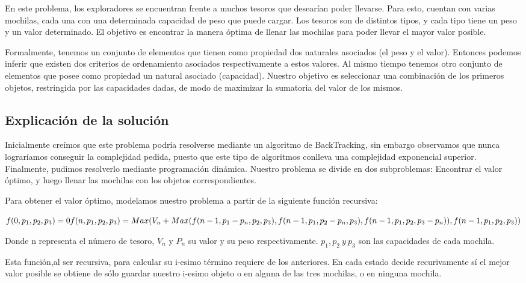 \documentclass[spanish,12pt]{article}
\begin{document}
{En este problema, los exploradores se encuentran frente a muchos tesoros que desearían poder llevarse. Para esto, cuentan con varias mochilas, cada una con una determinada capacidad de peso que puede cargar.
Los tesoros son de distintos tipos, y cada tipo tiene un peso y un valor determinado.
El objetivo es encontrar la manera óptima de llenar las mochilas para poder llevar el mayor valor posible.

Formalmente, tenemos un conjunto de elementos que tienen como propiedad dos naturales asociados (el peso y el valor). Entonces podemos inferir que existen dos criterios de ordenamiento asociados respectivamente a estos valores.
Al mismo tiempo tenemos otro conjunto de elementos que posee como propiedad un natural asociado (capacidad).
Nuestro objetivo es seleccionar una combinación de los primeros objetos, restringida por las capacidades dadas, de modo de maximizar la sumatoria del valor de los mismos. 


\subsection{Explicación de la solución}

   Inicialmente creímos que este problema podría resolverse mediante un algoritmo de BackTracking, sin embargo observamos que nunca lograríamos conseguir la complejidad pedida, puesto que este tipo de algoritmos conlleva una complejidad exponencial superior.
   Finalmente, pudimos resolverlo mediante programación dinámica. Nuestro problema se divide en dos subproblemas:
   Encontrar el valor óptimo, y luego llenar las mochilas con los objetos correspondientes.

   Para obtener el valor óptimo, modelamos nuestro problema a partir de la siguiente función recursiva:

	$f(0,p_{1},p_{2},p_{3})=0 \\
	f(n,p_{1},p_{2},p_{3}) = Max(V_{n}+Max(f(n-1,p_{1}-p_{n},p_{2},p_{3}), f(n-1,p_{1},p_{2}-p_{n},p_{3}), f(n-1,p_{1},p_{2},p_{3}-p_{n})),f(n-1,p_{1},p_{2},p_{3})) $

	Donde n representa el número de tesoro, $V_{n}$ y $P_{n}$ su valor y su peso respectivamente. $p_{1},p_{2}\ y \ p_{3}$ son las capacidades de cada mochila.

	Esta función,al ser recursiva, para calcular su i-esimo término requiere de los anteriores. En cada estado decide recurivamente sí el mejor valor posible se obtiene de sólo guardar nuestro i-esimo objeto o en alguna de las tres mochilas, o en ninguna mochila.  



}
\end{document}
